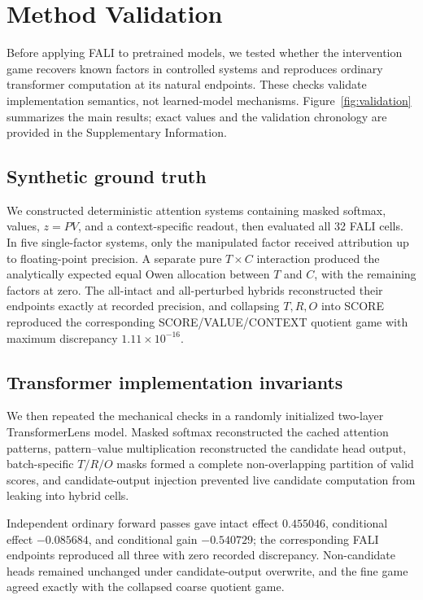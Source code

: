 \section{Method Validation}\label{sec:validation}

Before applying FALI to pretrained models, we tested whether the intervention game recovers known factors in controlled systems and reproduces ordinary transformer computation at its natural endpoints. These checks validate implementation semantics, not learned-model mechanisms. Figure~\ref{fig:validation} summarizes the main results; exact values and the validation chronology are provided in the Supplementary Information.



\subsection{Synthetic ground truth}\label{sec:synthetic}

We constructed deterministic attention systems containing masked softmax, values, $z=PV$, and a context-specific readout, then evaluated all 32 FALI cells. In five single-factor systems, only the manipulated factor received attribution up to floating-point precision. A separate pure $T\times C$ interaction produced the analytically expected equal Owen allocation between $T$ and $C$, with the remaining factors at zero. The all-intact and all-perturbed hybrids reconstructed their endpoints exactly at recorded precision, and collapsing $T,R,O$ into SCORE reproduced the corresponding SCORE\slash VALUE\slash CONTEXT quotient game with maximum discrepancy $1.11\times10^{-16}$.

\subsection{Transformer implementation invariants}\label{sec:implementation-validation}

We then repeated the mechanical checks in a randomly initialized two-layer TransformerLens model. Masked softmax reconstructed the cached attention patterns, pattern--value multiplication reconstructed the candidate head output, batch-specific $T/R/O$ masks formed a complete non-overlapping partition of valid scores, and candidate-output injection prevented live candidate computation from leaking into hybrid cells.

Independent ordinary forward passes gave intact effect $0.455046$, conditional effect $-0.085684$, and conditional gain $-0.540729$; the corresponding FALI endpoints reproduced all three with zero recorded discrepancy. Non-candidate heads remained unchanged under candidate-output overwrite, and the fine game agreed exactly with the collapsed coarse quotient game.

